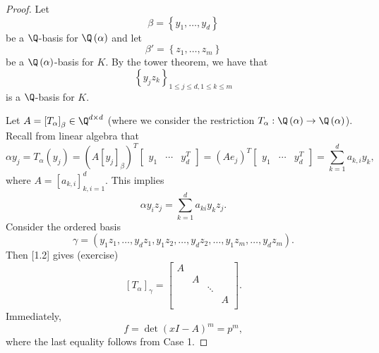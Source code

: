 \documentclass[pmath441]{subfiles}
\begin{document}
    \begin{proof}
        Let
        \begin{equation*}
            \beta = \left\lbrace y_1,\ldots,y_d \right\rbrace
        \end{equation*}
        be a $\Q$-basis for $\Q\left( \alpha \right)$ and let
        \begin{equation*}
            \beta' = \left\lbrace z_1,\ldots,z_m \right\rbrace
        \end{equation*}
        be a $\Q\left( \alpha \right)$-basis for $K$. By the tower theorem, we have that
        \begin{equation*}
            \left\lbrace y_jz_k \right\rbrace_{1\leq j\leq d, 1\leq k\leq m}
        \end{equation*}
        is a $\Q$-basis for $K$.

        Let $A = \left[ T_{\alpha} \right]_{\beta}\in\Q^{d\times d}$ (where we consider the restriction $T_{\alpha}:\Q\left( \alpha \right)\to\Q\left( \alpha \right)$). Recall from linear algebra that
        \begin{equation*}
            \alpha y_j = T_{\alpha}\left( y_j \right) = \left(A\left[ y_j \right]_{\beta}\right)^{T} 
            \begin{bmatrix} y_1 & \cdots & y_d^{T} \end{bmatrix}
            = \left( Ae_j \right)^{T}
            \begin{bmatrix} y_1 & \cdots & y_d^{T} \end{bmatrix}
            = \sum^{d}_{k=1} a_{k,i} y_k,
        \end{equation*}
        where $A = \left[ a_{k,i} \right]^{d}_{k,i=1}$. This implies
        \begin{equation}
            \alpha y_iz_j = \sum^{d}_{k=1} a_{ki}y_kz_j.
        \end{equation}
        Consider the ordered basis
        \begin{equation*}
            \gamma = \left( y_1z_1,\ldots,y_dz_1,y_1z_2,\ldots,y_dz_2,\ldots,y_1z_m,\ldots,y_dz_m \right).
        \end{equation*}
        Then [1.2] gives (exercise)
        \begin{equation*}
            \left[ T_{\alpha} \right]_{\gamma} =
            \begin{bmatrix}
            	A &  &  &  \\
            	 & A &  &  \\
            	 &  & \ddots &  \\
            	 &  &  & A \\
            \end{bmatrix}.
        \end{equation*}
        Immediately,
        \begin{equation*}
            f = \det\left( xI-A \right)^m = p^m,
        \end{equation*}
        where the last equality follows from Case 1.
    \end{proof}
    
\end{document}
